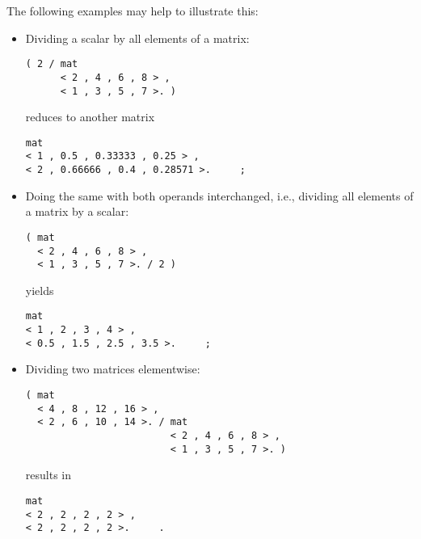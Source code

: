 The following examples may help to illustrate this:
\begin{itemize}
\item Dividing a scalar by all elements of a matrix:
\begin{verbatim}
( 2 / mat 
      < 2 , 4 , 6 , 8 > ,
      < 1 , 3 , 5 , 7 >. )
\end{verbatim}
reduces to another matrix
\begin{verbatim}
mat 
< 1 , 0.5 , 0.33333 , 0.25 > ,
< 2 , 0.66666 , 0.4 , 0.28571 >.     ;
\end{verbatim}
\item Doing the same with both operands interchanged, i.e., 
dividing all elements of a matrix by a scalar:
\begin{verbatim}
( mat 
  < 2 , 4 , 6 , 8 > ,
  < 1 , 3 , 5 , 7 >. / 2 )
\end{verbatim}
yields
\begin{verbatim}
mat 
< 1 , 2 , 3 , 4 > ,
< 0.5 , 1.5 , 2.5 , 3.5 >.     ;
\end{verbatim}
\item Dividing two matrices elementwise:
\begin{verbatim}
( mat 
  < 4 , 8 , 12 , 16 > ,
  < 2 , 6 , 10 , 14 >. / mat 
                         < 2 , 4 , 6 , 8 > ,
                         < 1 , 3 , 5 , 7 >. )
\end{verbatim}
results in
\begin{verbatim}
mat 
< 2 , 2 , 2 , 2 > ,
< 2 , 2 , 2 , 2 >.     .
\end{verbatim}
\end{itemize}

